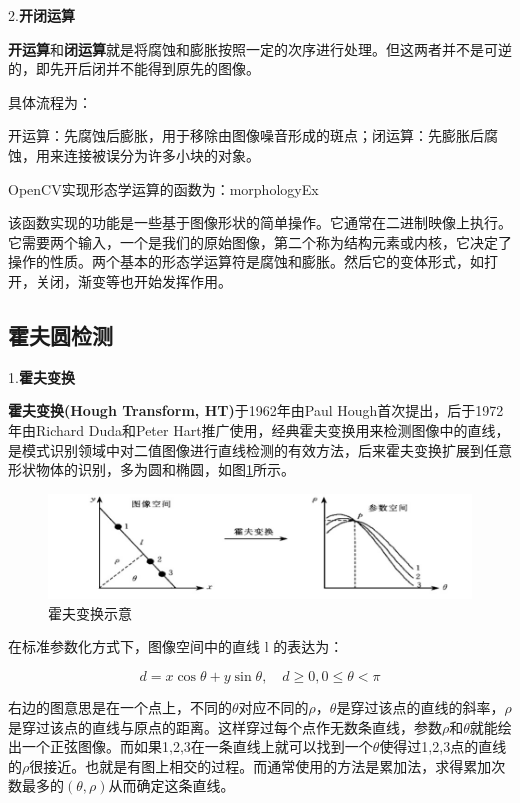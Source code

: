 2.\textbf{开闭运算}

\textbf{开运算}和\textbf{闭运算}就是将腐蚀和膨胀按照一定的次序进行处理。但这两者并不是可逆的，即先开后闭并不能得到原先的图像。

具体流程为：

开运算：先腐蚀后膨胀，用于移除由图像噪音形成的斑点；闭运算：先膨胀后腐蚀，用来连接被误分为许多小块的对象。

OpenCV实现形态学运算的函数为：morphologyEx

该函数实现的功能是一些基于图像形状的简单操作。它通常在二进制映像上执行。它需要两个输入，一个是我们的原始图像，第二个称为结构元素或内核，它决定了操作的性质。两个基本的形态学运算符是腐蚀和膨胀。然后它的变体形式，如打开，关闭，渐变等也开始发挥作用。

\subsection{霍夫圆检测}

1.\textbf{霍夫变换}

\textbf{霍夫变换(Hough Transform, HT)}于1962年由Paul Hough首次提出，后于1972年由Richard Duda和Peter Hart推广使用，经典霍夫变换用来检测图像中的直线，是模式识别领域中对二值图像进行直线检测的有效方法\cite{Art2}，后来霍夫变换扩展到任意形状物体的识别，多为圆和椭圆，如图\ref{Fig:img1}所示。

\begin{figure}[ht]
  \centering
  \includegraphics[width=0.8\linewidth]{./Figure/Hough_Transform.png}
  \caption{霍夫变换示意}\label{Fig:img1}
\end{figure}

在标准参数化方式下，图像空间中的直线 l 的表达为：

\begin{equation}
d=x \cos \theta+y \sin \theta, \quad d \geqslant 0,0 \leqslant \theta<\pi
\end{equation}

右边的图意思是在一个点上，不同的$\theta$对应不同的$\rho$，$\theta$是穿过该点的直线的斜率，$\rho$是穿过该点的直线与原点的距离。这样穿过每个点作无数条直线，参数$\rho$和$\theta$就能绘出一个正弦图像。而如果1,2,3在一条直线上就可以找到⼀个$\theta$使得过1,2,3点的直线的$\rho$很接近。也就是有图上相交的过程。而通常使用的方法是累加法，求得累加次数最多的$(\theta, \rho)$从而确定这条直线。

